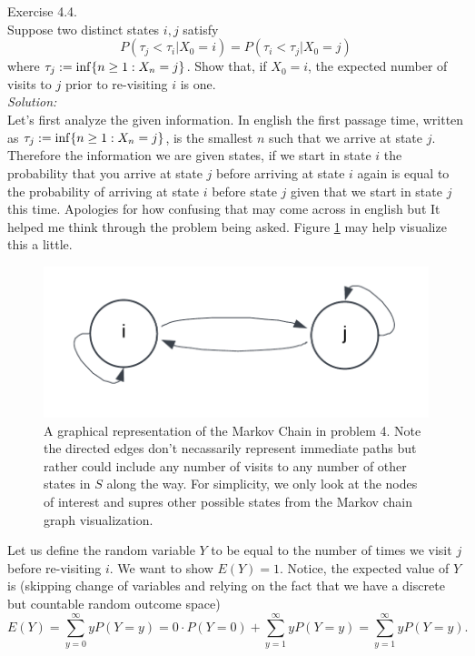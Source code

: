 \documentclass[10pt]{amsart}
\begin{document}
  Exercise 4.4. \\
Suppose two distinct states $i, j$ satisfy
$$
P(\tau_j < \tau_i | X_0 = i) = P(\tau_i < \tau_j | X_0 = j)
$$
where $\tau_j := {\rm inf}\{n \geq 1: X_n = j\}$.
Show that, if $X_0 = i$, the expected number of visits to $j$ prior to re-visiting $i$ is one. \\

\noindent
\textit{Solution:} \\
Let's first analyze the given information.
In english the first passage time, written as $\tau_j := {\rm inf}\{n \geq 1: X_n = j\}$, is the smallest $n$ such that we arrive at state $j$.
Therefore the information we are given states, if we start in state $i$ the probability that you arrive at state $j$ before arriving at state $i$ again is equal to the probability of arriving at state $i$ before state $j$ given that we start in state $j$ this time.
Apologies for how confusing that may come across in english but It helped me think through the problem being asked.
Figure \ref{fig:f6} may help visualize this a little.
\begin{figure}[h]
	\centering
	\includegraphics[scale=0.85]{four_markov_graph.png}
	\caption{
		A graphical representation of the Markov Chain in problem 4. Note the directed edges don't necassarily represent immediate paths but rather could include any number of visits to any number of other states in $S$ along the way. For simplicity, we only look at the nodes of interest and supres other possible states from the Markov chain graph visualization.
	}\label{fig:f6}
\end{figure}
Let us define the random variable $Y$ to be equal to the number of times we visit $j$ before re-visiting $i$.
We want to show $E(Y) = 1$.
Notice, the expected value of $Y$ is (skipping change of variables and relying on the fact that we have a discrete but countable random outcome space)
$$
E(Y) = \sum_{y=0}^\infty yP(Y = y) = 0 \cdot P(Y = 0) + \sum_{y=1}^\infty yP(Y = y) = \sum_{y=1}^\infty yP(Y = y).
$$
\end{document}
